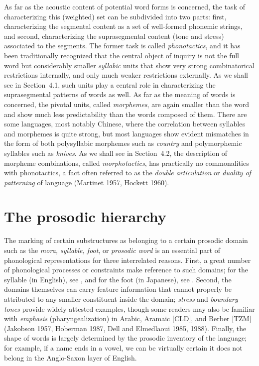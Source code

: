 As far as the acoustic content of potential word forms is concerned, the task
of characterizing this (weighted) set can be subdivided into two parts: first,
characterizing the segmental content as a set of well-formed phonemic strings,
and second, characterizing the suprasegmental content (tone and stress)
associated to the segments. The former task is called {\it phonotactics}, and
it has been traditionally recognized that the central object of inquiry is not
the full word but considerably smaller {\it syllabic} units that show very
strong combinatorical restrictions internally, and only much weaker
restrictions externally. As we shall see in Section~4.1, such units play a central
role in characterizing the suprasegmental patterns of words as well. As far as
the meaning of words is concerned, the pivotal units, called {\it morphemes},
are again smaller than the word and show much less predictability than the
words composed of them.  There are some languages, most notably Chinese, where
the correlation between syllables and morphemes is quite strong, but most
languages show evident mismatches in the form of both polysyllabic morphemes
such as {\it country} and polymorphemic syllables such as {\it knives}. As we
shall see in Section~4.2, the description of morpheme combinations, called {\it
morphotactics}, has practically no commonalities with phonotactics, a fact
often referred to as the {\it double articulation} or {\it duality of
patterning} of language (Martinet 1957, Hockett 1960). \nocite{Martinet:1957}
\nocite{Hockett:1960} 
 

\section{The prosodic hierarchy}

The marking of certain substructures as belonging to a certain prosodic domain
such as the {\it mora, syllable, foot}, or {\it prosodic word}
is an essential part of phonological representations for three interrelated
reasons. First, a
great number of phonological processes or constraints make reference to such
domains; for the syllable (in English), see , and for the
foot (in Japanese), see .  Second, the domains themselves
can carry feature information that cannot properly be attributed to any smaller
constituent inside the domain; {\it stress} and {\it boundary tones} provide
widely attested examples,   though some
readers may also be familiar with {\it emphasis} (pharyngealization) in
Arabic, Aramaic [CLD], and Berber [TZM] (Jakobson 1957, Hoberman 1987, Dell
and Elmedlaoui 1985,
1988).\nocite{Jakobson:1957}\nocite{Hoberman:1987}\nocite{Dell:1985}\nocite{Dell:1988} 
Finally, the shape of words is largely determined
by the prosodic inventory of the language; for example, if a name ends in a
vowel, we can be virtually certain it does not belong in the Anglo-Saxon layer
of English.

